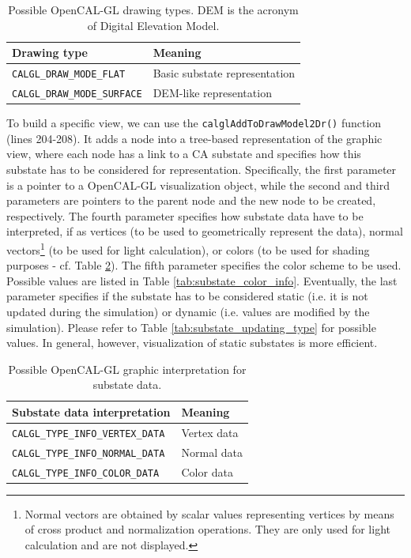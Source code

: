 \begin{table}
  \centering
  \footnotesize
  \begin{tabular}{l|l}
    \hline
    Drawing type & Meaning \\
    \hline
    \verb'CALGL_DRAW_MODE_FLAT'    & Basic substate representation \\
    \verb'CALGL_DRAW_MODE_SURFACE' & DEM-like representation \\
    \hline
  \end{tabular}
  \caption{Possible OpenCAL-GL drawing types. DEM is the acronym of Digital Elevation Model.}
  \label{tab:draw_modes}
\end{table}

To build a specific view, we can use the
\verb'calglAddToDrawModel2Dr()' function (lines 204-208). It adds a
node into a tree-based representation of the graphic view, where each
node has a link to a CA substate and specifies how this substate has
to be considered for representation. Specifically, the first parameter
is a pointer to a OpenCAL-GL visualization object, while the second
and third parameters are pointers to the parent node and the new node
to be created, respectively. The fourth parameter specifies how
substate data have to be interpreted, if as vertices (to be used to
geometrically represent the data), normal vectors\footnote{Normal
  vectors are obtained by scalar values representing vertices by means
  of cross product and normalization operations. They are only used
  for light calculation and are not displayed.} (to be used for light
calculation), or colors (to be used for shading purposes - cf. Table
\ref{tab:substate_type_info}). The fifth parameter specifies the color
scheme to be used. Possible values are listed in Table
\ref{tab:substate_color_info}. Eventually, the last parameter
specifies if the substate has to be considered static (i.e. it is not
updated during the simulation) or dynamic (i.e. values are modified by
the simulation). Please refer to Table
\ref{tab:substate_updating_type} for possible values. In general,
however, visualization of static substates is more efficient.

\begin{table}
  \centering
  \small
  \begin{tabular}{l|l}
    \hline
    Substate data interpretation & Meaning\\
    \hline
    \verb'CALGL_TYPE_INFO_VERTEX_DATA' & Vertex data\\
    \verb'CALGL_TYPE_INFO_NORMAL_DATA' & Normal data\\
    \verb'CALGL_TYPE_INFO_COLOR_DATA'  & Color data\\
    \hline
  \end{tabular}
  \caption{Possible OpenCAL-GL graphic interpretation for substate data.}
  \label{tab:substate_type_info}
\end{table}

